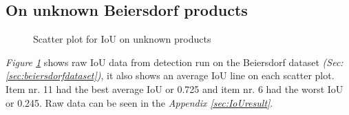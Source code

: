 \clearpage
\subsection{On unknown Beiersdorf products}
\begin{figure}[h]
    \centering
    \hfill
    
    \caption{Scatter plot for IoU on unknown products}
    \label{figure: unknownproducts}
\end{figure}
\textit{Figure \ref{figure: unknownproducts}} shows raw IoU data from detection run on the Beiersdorf dataset \textit{(Sec: \ref{sec:beiersdorfdataset})}, it also shows an average IoU line on each scatter plot. Item nr. 11 had the best average IoU or 0.725 and item nr. 6 had the worst IoU or 0.245. Raw data can be seen in the \textit{Appendix \ref{sec:IoUresult}}.

